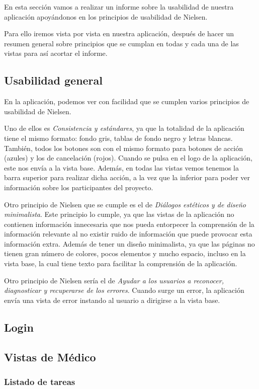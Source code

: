 En esta sección vamos a realizar un informe sobre la usabilidad de nuestra aplicación apoyándonos en los principios de usabilidad de Nielsen.

Para ello iremos vista por vista en nuestra aplicación, después de hacer un resumen general sobre principios que se cumplan en todas y cada una de las vistas para así acortar el informe.
\subsection{Usabilidad general}
En la aplicación, podemos ver con facilidad que se cumplen varios principios de usabilidad de Nielsen.

Uno de ellos es \textit{Consistencia y estándares}, ya que la totalidad de la aplicación tiene el mismo formato: fondo gris, tablas de fondo negro y letras blancas. También, todos los botones son con el mismo formato para botones de acción (azules) y los de cancelación (rojos). 
Cuando se pulsa en el logo de la aplicación, este nos envía a la vista base. Además, en todas las vistas vemos tenemos la barra superior para realizar dicha acción, a la vez que la inferior para poder ver información sobre los participantes del proyecto.

Otro principio de Nielsen que se cumple es el de \textit{Diálogos estéticos y de diseño minimalista}. Este principio lo cumple, ya que las vistas de la aplicación no contienen información innecesaria que nos pueda entorpecer la comprensión de la
información relevante al no existir ruido de información que puede provocar esta
información extra. Además de tener un diseño minimalista, ya que las páginas no tienen
gran número de colores, pocos elementos y mucho espacio, incluso en la vista base, la cual tiene texto para facilitar la comprensión de la aplicación.

Otro principio de Nielsen sería el de \textit{Ayudar a los usuarios a reconocer, diagnosticar y recuperarse de los errores}. Cuando
surge un error, la aplicación envía una vista de error instando al usuario a dirigirse a la vista base.

\subsection{Login}
\subsection{Vistas de Médico}
\subsubsection{Listado de tareas}

